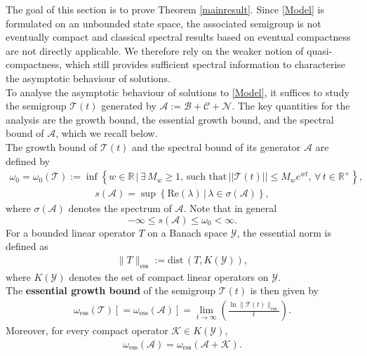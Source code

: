 \documentclass[12pt,a4paper]{amsart}
\begin{document}
\noindent The goal of this section is to prove Theorem \ref{mainresult}. Since \eqref{Model} is formulated on an unbounded state space, the associated semigroup is not eventually compact and classical spectral results based on eventual compactness are not directly applicable. We therefore rely on the weaker notion of quasi-compactness, which still provides sufficient spectral information to characterise the asymptotic behaviour of solutions.\\
To analyse the asymptotic behaviour of solutions to \eqref{Model}, it suffices to study the semigroup $\mathcal{T}(t)$ generated by $\mathcal{A}:=\mathcal{B}+\mathcal{C}+\mathcal{N}$. The key quantities for the analysis are the growth bound, the essential growth bound, and the spectral bound of $\mathcal{A}$, which we recall below.\\
The growth bound of $\mathcal{T}(t)$ and the spectral bound of its generator $\mathcal{A}$ are defined by
    \begin{align}
\label{growth_bound}
\omega_0=\omega_0(\mathcal{T}):=\inf\left\{w\in\mathbb{R}\,|\,\exists\, M_w\ge 1,\,\text{such that}\,  ||\mathcal{T}(t)||\le M_w e^{wt},\,\forall\,t\in\mathbb{R}^+ \right\},
    \end{align}
    \begin{align*}
    s(\mathcal{A})=\sup\left\{\text{Re}(\lambda)\,|\,\lambda\in\sigma(\mathcal{A})\right\},
    \end{align*}
where $\sigma(\mathcal{A})$ denotes the spectrum of $\mathcal{A}$. Note that in general
\[
-\infty\le s(\mathcal{A})\le\omega_0<\infty.
\]
For a bounded linear operator $T$ on a Banach space $\mathcal Y$, the essential norm is defined as
    \begin{align*}
	\|T\|_\text{ess}:=\text{dist}\,\left(T, K({\mathcal Y})\right),
    \end{align*}
where $K({\mathcal Y})$ denotes the set of compact linear operators on $\mathcal Y$.\\
The \textbf{essential growth bound} of the semigroup $\mathcal{T}(t)$ is then given by
    \begin{align*}
\omega_\text{ess}\left(\mathcal{T}\right)\left[=\omega_\text{ess}\left(\mathcal{A}\right)\right]
=
\lim_{t\rightarrow \infty}
\left(\frac{\ln \|\mathcal{T}(t)\|_\text{ess}}{t}\right).
    \end{align*}
Moreover, for every compact operator ${\mathcal K}\in K({\mathcal Y})$,
    \begin{align*}
	\omega_\text{ess}\left({\mathcal A}\right)=\omega_\text{ess}\left({\mathcal A}+{\mathcal K}\right).
    \end{align*}
\end{document}
